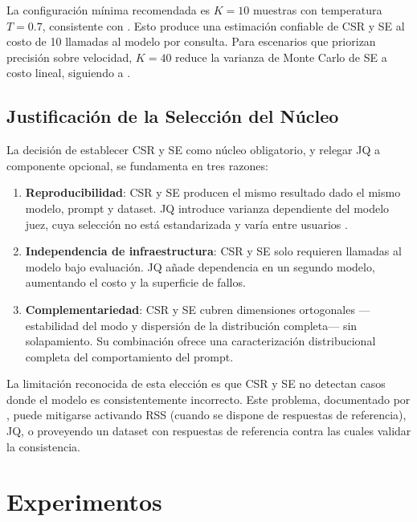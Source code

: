 \documentclass[11pt,a4paper]{article}
\begin{document}
La configuración mínima recomendada es $K=10$ muestras con temperatura $T=0.7$, consistente con \citet{glape2024}. Esto produce una estimación confiable de CSR y SE al costo de 10 llamadas al modelo por consulta. Para escenarios que priorizan precisión sobre velocidad, $K=40$ reduce la varianza de Monte Carlo de SE a costo lineal, siguiendo a \citet{selfconsistency2023}.

\subsection{Justificación de la Selección del Núcleo}

La decisión de establecer CSR y SE como núcleo obligatorio, y relegar JQ a componente opcional, se fundamenta en tres razones:

\begin{enumerate}[noitemsep]
    \item \textbf{Reproducibilidad}: CSR y SE producen el mismo resultado dado el mismo modelo, prompt y dataset. JQ introduce varianza dependiente del modelo juez, cuya selección no está estandarizada y varía entre usuarios \citep{geval2023}.
    \item \textbf{Independencia de infraestructura}: CSR y SE solo requieren llamadas al modelo bajo evaluación. JQ añade dependencia en un segundo modelo, aumentando el costo y la superficie de fallos.
    \item \textbf{Complementariedad}: CSR y SE cubren dimensiones ortogonales ---estabilidad del modo y dispersión de la distribución completa--- sin solapamiento. Su combinación ofrece una caracterización distribucional completa del comportamiento del prompt.
\end{enumerate}

La limitación reconocida de esta elección es que CSR y SE no detectan casos donde el modelo es consistentemente incorrecto. Este problema, documentado por \citet{glape2024}, puede mitigarse activando RSS (cuando se dispone de respuestas de referencia), JQ, o proveyendo un dataset con respuestas de referencia contra las cuales validar la consistencia.

\section{Experimentos}
\label{sec:experiments}
\end{document}
